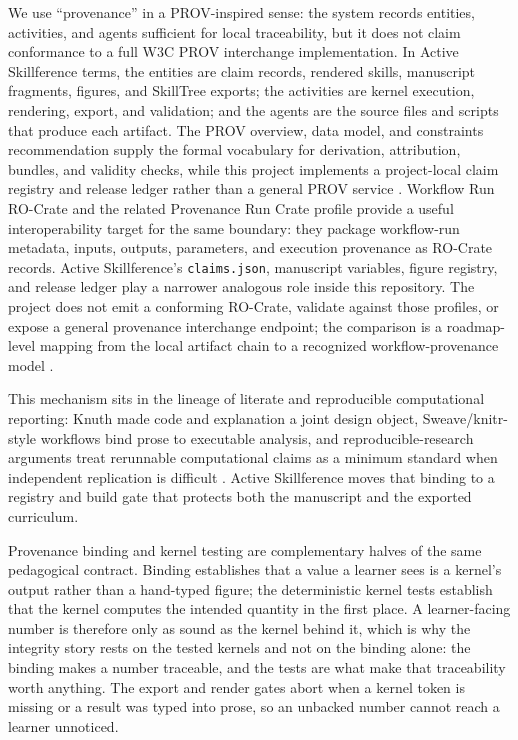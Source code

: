 \documentclass[
  english,
]{article}
\begin{document}
We use ``provenance'' in a PROV-inspired sense: the system records
entities, activities, and agents sufficient for local traceability, but
it does not claim conformance to a full W3C PROV interchange
implementation. In Active Skillference terms, the entities are claim
records, rendered skills, manuscript fragments, figures, and SkillTree
exports; the activities are kernel execution, rendering, export, and
validation; and the agents are the source files and scripts that produce
each artifact. The PROV overview, data model, and constraints
recommendation supply the formal vocabulary for derivation, attribution,
bundles, and validity checks, while this project implements a
project-local claim registry and release ledger rather than a general
PROV service
\citep{groth2013prov_overview, moreau2013prov_dm, cheney2013prov_constraints}.
Workflow Run RO-Crate and the related Provenance Run Crate profile
provide a useful interoperability target for the same boundary: they
package workflow-run metadata, inputs, outputs, parameters, and
execution provenance as RO-Crate records. Active Skillference's
\texttt{claims.json}, manuscript variables, figure registry, and release
ledger play a narrower analogous role inside this repository. The
project does not emit a conforming RO-Crate, validate against those
profiles, or expose a general provenance interchange endpoint; the
comparison is a roadmap-level mapping from the local artifact chain to a
recognized workflow-provenance model
\citep{leo2024workflow_run_rocrate}.

This mechanism sits in the lineage of literate and reproducible
computational reporting: Knuth made code and explanation a joint design
object, Sweave/knitr-style workflows bind prose to executable analysis,
and reproducible-research arguments treat rerunnable computational
claims as a minimum standard when independent replication is difficult
\citep{knuth1984literate, xie2015knitr, peng2011reproducible, sandve2013reproducible}.
Active Skillference moves that binding to a registry and build gate that
protects both the manuscript and the exported curriculum.

Provenance binding and kernel testing are complementary halves of the
same pedagogical contract. Binding establishes that a value a learner
sees is a kernel's output rather than a hand-typed figure; the
deterministic kernel tests establish that the kernel computes the
intended quantity in the first place. A learner-facing number is
therefore only as sound as the kernel behind it, which is why the
integrity story rests on the tested kernels and not on the binding
alone: the binding makes a number traceable, and the tests are what make
that traceability worth anything. The export and render gates abort when
a kernel token is missing or a result was typed into prose, so an
unbacked number cannot reach a learner unnoticed.
\end{document}
